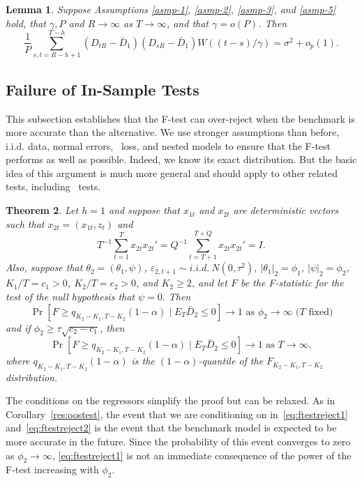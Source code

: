 \documentclass[11pt]{article}
\newtheorem{thm}{Theorem}[section]
\newtheorem{lem}[thm]{Lemma}
\newcommand{\oosSum}[2]{\ensuremath{\sum_{#1=R-\h+#2}^{T-\h}}}
\newcommand{\h}{h}
\newcommand{\vWeight}{W((t-s)/\gamma)}
\begin{document}
\begin{lem}
  \label{res-variance-estimator}  Suppose Assumptions \ref{asmp-1},
  \ref{asmp-2}, \ref{asmp-3}, and \ref{asmp-5} hold, that $\gamma, P$
  and $R \to \infty$ as $T \to \infty$, and that $\gamma = o(P)$.  Then
  \begin{equation*}
    \frac1P \oosSum{s,t}{1} (D_{tR} - \bar D_1)(D_{sR} - \bar D_1)
    \vWeight = \sigma^2 + o_p(1).
  \end{equation*}
\end{lem}


\subsection{Failure of In-Sample Tests}\label{sec:insample}
This subsection establishes that the F-test can over-reject when the
benchmark is more accurate than the alternative.  We use stronger
assumptions than before, i.i.d. data, normal errors, \mse\ loss, and
nested models to ensure that the F-test performs as well as possible.
Indeed, we know its exact distribution.  But the basic idea of this
argument is much more general and should apply to other related tests,
including \oos\ tests.

\begin{thm}\label{res:ftest}
  Let $\h = 1$ and suppose that $x_{1t}$ and $x_{2t}$ are
  deterministic vectors such that $x_{2t} = (x_{1t}, z_t)$ and
\[
T^{-1} \sum_{t=1}^T x_{2t} x_{2t}'  = Q^{-1} \sum_{t=T+1}^{T+Q} x_{2t} x_{2t}' =
I.
\]
Also, suppose that $\theta_2 = (\theta_1, \psi)$, 
$\varepsilon_{2,t+1} \sim i.i.d.\ N(0,\tau^2)$,
$|\theta_1|_2 = \phi_1$, $|\psi|_2 = \phi_2$, $K_1/T = c_1 > 0$,
$K_2/T = c_2 > 0$, and $K_2 \geq 2$, and let $F$ be the F-statistic
for the test of the null hypothesis that $\psi = 0.$
Then 
\begin{equation}\label{eq:ftestreject1}
  \Pr[F \geq q_{K_2 - K_1, T - K_2}(1-\alpha) \mid E_T \bar{D}_2 \leq 0
  ] \to 1\mbox{ as $\phi_2 \to \infty$ ($T$ fixed)}
\end{equation}
and if $\phi_2 \geq \tau \sqrt{c_2 - c_1}$, then
\begin{equation}\label{eq:ftestreject2}
  \Pr[F \geq q_{K_2 - K_1, T - K_2}(1-\alpha) \mid E_T \bar{D}_2 \leq 0
  ] \to 1 \text{ as $T \to \infty$},
\end{equation}
where $q_{K_2-K_1, T-K_2}(1-\alpha)$ is the
$(1-\alpha)$-quantile of the $F_{K_2-K_1, T-K_2}$ distribution.
\end{thm}
The conditions on the regressors simplify the proof but can be
relaxed.  As in Corollary~\ref{res:oostest}, the event that we are
conditioning on in~\eqref{eq:ftestreject1} and~\eqref{eq:ftestreject2}
is the event that the benchmark model is expected to be more accurate
in the future.  Since the probability of this event converges to zero
as $\phi_2 \to \infty$, \eqref{eq:ftestreject1} is not an immediate
consequence of the power of the F-test increasing with $\phi_2$.
\end{document}
